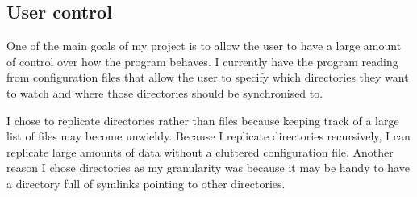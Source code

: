 \documentclass[12pt]{article}
\begin{document}

\subsection{User control}
One of the main goals of my project is to allow the user
to have a  large amount of control over how the program
behaves. I currently have the program reading from
configuration files that allow the user to specify
which directories they want to watch and where those
directories should be synchronised to.

I chose to replicate directories rather than files
because keeping track of a large list of files may become unwieldy.
Because I replicate
directories recursively, I can replicate large amounts
of data without a cluttered configuration file.
Another reason I chose directories as my granularity was because it may be
handy to have a directory full of symlinks pointing to other directories.
\end{document}
